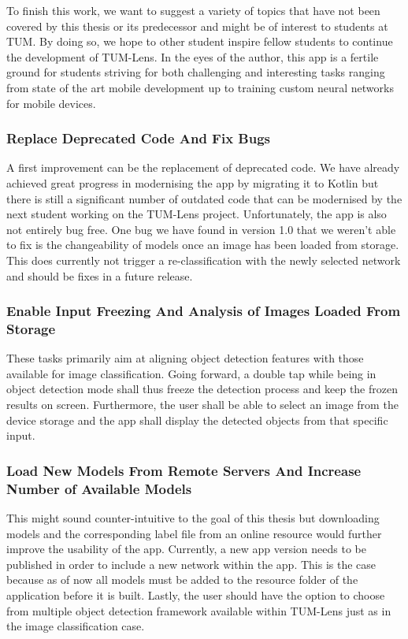 \documentclass[
			   fontsize=11pt,
               paper=a4,
               bibliography=totoc,
               idxtotoc,
               headsepline,
               footsepline,
               footinclude=false,
               BCOR=12mm,
               DIV=13,
               openany,   %
               ]
               {scrbook}
\begin{document}
To finish this work, we want to suggest a variety of topics that have not been covered by this thesis or its predecessor and might be of interest to students at TUM. By doing so, we hope to other student inspire fellow students to continue the development of TUM-Lens. In the eyes of the author, this app is a fertile ground for students striving for both challenging and interesting tasks ranging from state of the art mobile development up to training custom neural networks for mobile devices.

\subsubsection{Replace Deprecated Code And Fix Bugs}
A first improvement can be the replacement of deprecated code. We have already achieved great progress in modernising the app by migrating it to Kotlin but there is still a significant number of outdated code that can be modernised by the next student working on the TUM-Lens project. Unfortunately, the app is also not entirely bug free. One bug we have found in version 1.0 that we weren't able to fix is the changeability of models once an image has been loaded from storage. This does currently not trigger a re-classification with the newly selected network and should be fixes in a future release.

\subsubsection{Enable Input Freezing And Analysis of Images Loaded From Storage}
These tasks primarily aim at aligning object detection features with those available for image classification. Going forward, a double tap while being in object detection mode shall thus freeze the detection process and keep the frozen results on screen. Furthermore, the user shall be able to select an image from the device storage and the app shall display the detected objects from that specific input.

\subsubsection{Load New Models From Remote Servers And Increase Number of Available Models}
This might sound counter-intuitive to the goal of this thesis but downloading models and the corresponding label file from an online resource would further improve the usability of the app. Currently, a new app version needs to be published in order to include a new network within the app. This is the case because as of now all models must be added to the resource folder of the application before it is built. Lastly, the user should have the option to choose from multiple object detection framework available within TUM-Lens just as in the image classification case.
\end{document}

